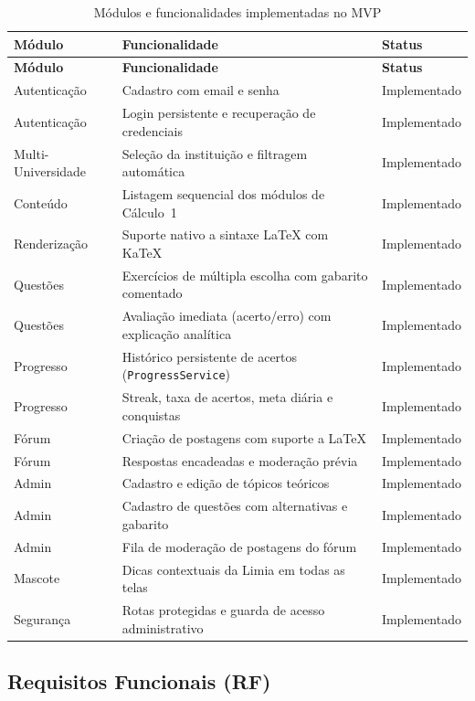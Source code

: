 \documentclass[12pt, a4paper]{article}
\begin{document}
\begin{longtable}{l p{8cm} l}
\caption{M\'{o}dulos e funcionalidades implementadas no MVP} \\
\toprule
\textbf{M\'{o}dulo} & \textbf{Funcionalidade} & \textbf{Status} \\
\midrule
\endfirsthead
\toprule
\textbf{M\'{o}dulo} & \textbf{Funcionalidade} & \textbf{Status} \\
\midrule
\endhead
Autentica\c{c}\~{a}o & Cadastro com email e senha & Implementado \\
Autentica\c{c}\~{a}o & Login persistente e recupera\c{c}\~{a}o de credenciais & Implementado \\
Multi-Universidade & Sele\c{c}\~{a}o da institui\c{c}\~{a}o e filtragem autom\'{a}tica & Implementado \\
Conte\'{u}do & Listagem sequencial dos m\'{o}dulos de C\'{a}lculo~1 & Implementado \\
Renderiza\c{c}\~{a}o & Suporte nativo a sintaxe \LaTeX{} com KaTeX & Implementado \\
Quest\~{o}es & Exerc\'{i}cios de m\'{u}ltipla escolha com gabarito comentado & Implementado \\
Quest\~{o}es & Avalia\c{c}\~{a}o imediata (acerto/erro) com explica\c{c}\~{a}o anal\'{i}tica & Implementado \\
Progresso & Hist\'{o}rico persistente de acertos (\texttt{ProgressService}) & Implementado \\
Progresso & Streak, taxa de acertos, meta di\'{a}ria e conquistas & Implementado \\
F\'{o}rum & Cria\c{c}\~{a}o de postagens com suporte a \LaTeX{} & Implementado \\
F\'{o}rum & Respostas encadeadas e modera\c{c}\~{a}o pr\'{e}via & Implementado \\
Admin & Cadastro e edi\c{c}\~{a}o de t\'{o}picos te\'{o}ricos & Implementado \\
Admin & Cadastro de quest\~{o}es com alternativas e gabarito & Implementado \\
Admin & Fila de modera\c{c}\~{a}o de postagens do f\'{o}rum & Implementado \\
Mascote & Dicas contextuais da Limia em todas as telas & Implementado \\
Seguran\c{c}a & Rotas protegidas e guarda de acesso administrativo & Implementado \\
\bottomrule
\end{longtable}

\subsection{Requisitos Funcionais (RF)}
\end{document}
